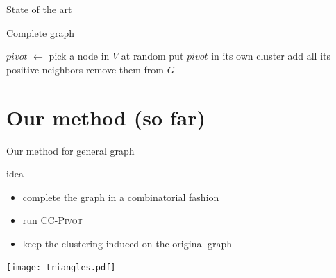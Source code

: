 \documentclass[final,xcolor=svgnames,A4]{beamer}
\newcommand*\Let[2]{\State #1 $\gets$ #2}
\begin{document}
\begin{frame}{State of the art}
				\begin{block}{Complete graph}
					\begin{algorithmic}[0]
							\Let{$pivot$}{pick a node in $V$ at random}
							\State put $pivot$ in its own cluster
							\State add all its positive neighbors
							\State remove them from $G$
						\EndWhile
						\EndFunction
					\end{algorithmic}
					\vspace*{3\baselineskip}
				\end{block}   
\end{frame}

\section[]{Our method (so far)}
\begin{frame}{Our method for general graph}
	\begin{block}{idea}
		\begin{itemize}
			\item complete the graph in a combinatorial fashion
			\item run \textsc{CC-Pivot}
			\item keep the clustering induced on the original graph
		\end{itemize}
		\centering
		\texttt{[image: triangles.pdf]}
	\end{block}

\end{frame}
\end{document}
